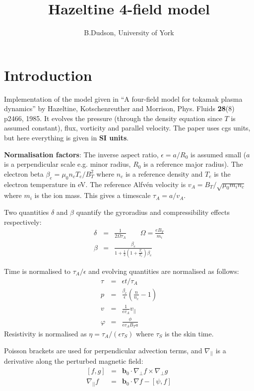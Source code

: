 \documentclass[12pt]{article}
\newcommand{\Vec}[1]{\ensuremath{\mathbf{#1}}}
\newcommand{\bvec}{\Vec{b}}
\newcommand{\bdotGxG}[2]{\ensuremath{\bvec_0\cdot\nabla_\perp #1 \times \nabla_\perp #2}}
\begin{document}
\title{Hazeltine 4-field model}
\author{B.Dudson, University of York}
\maketitle

\section{Introduction}

Implementation of the model given in ``A four-field model for tokamak plasma
dynamics'' by Hazeltine, Kotschenreuther and Morrison, Phys. Fluids {\bf 28}(8)
p2466, 1985. It evolves the pressure (through the density equation since $T$
is assumed constant), flux, vorticity and parallel velocity.
The paper uses cgs units, but here everything is given in {\bf SI units}.

{\bf Normalisation factors}: The inverse aspect ratio,
$\epsilon = a/R_0$ is assumed small ($a$ is a perpendicular scale e.g.
minor radius, $R_0$ is a reference major radius). The electron beta
$\beta_e = \mu_0n_cT_e / B_T^2$ where $n_c$ is a reference density and $T_e$
is the electron temperature in eV. The reference Alfv\'en velocity is 
$v_A = B_T / \sqrt{\mu_0 m_i n_c}$ where $m_i$ is the ion mass. This gives
a timescale $\tau_A = a / v_A$.

Two quantities $\delta$ and $\beta$ quantify the gyroradius and compressibility
effects respectively:
\begin{eqnarray*}
\delta &=& \frac{1}{2\Omega\tau_A} \qquad \Omega = \frac{eB_T}{m_i} \\
\beta &=& \frac{\beta_e}{1+\frac{1}{2}\left(1+\frac{T_i}{T_e}\right)\beta_e} 
\end{eqnarray*}

Time is normalised to $\tau_A / \epsilon$ and evolving quantities are 
normalised as follows:
\begin{eqnarray*}
\tau &=& \epsilon t / \tau_A \\
p &=& \frac{\beta_e}{\epsilon}\left(\frac{n}{n_c} - 1\right) \\
v &=& \frac{1}{\epsilon v_A}v_{||} \\
\varphi &=& \frac{\phi}{\epsilon v_A B_T a}
\end{eqnarray*}
Resistivity is normalised as $\eta = \tau_A/\left(\epsilon \tau_S\right)$
where $\tau_S$ is the skin time.

Poisson brackets are used for perpendicular advection terms,
and $\nabla_{||}$ is a derivative along the perturbed magnetic field:
\begin{eqnarray*}
\left[f, g\right] &=& \bdotGxG{f}{g} \\
\nabla_{||}f &=& \bvec_0\cdot\nabla f - \left[\psi, f\right]
\end{eqnarray*}
\end{document}
